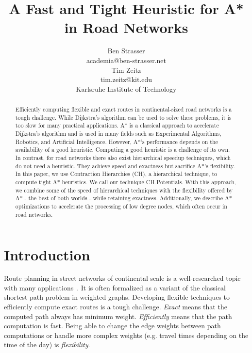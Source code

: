 \documentclass[letterpaper]{article} %
\title{A Fast and Tight Heuristic for A* in Road Networks}
\author{Ben Strasser\\
academia@ben-strasser.net\\
\And
Tim Zeitz\\
tim.zeitz@kit.edu\\
Karlsruhe Institute of Technology
}
\begin{document}
\maketitle


\begin{abstract}
Efficiently computing flexible and exact routes in continental-sized road networks is a tough challenge.
While Dijkstra's algorithm can be used to solve these problems, it is too slow for many practical applications.
A* is a classical approach to accelerate Dijkstra's algorithm and is used in many fields such as Experimental Algorithms, Robotics, and Artificial Intelligence.
However, A*'s performance depends on the availability of a good heuristic.
Computing a good heuristic is a challenge of its own.
In contrast, for road networks there also exist hierarchical speedup techniques, which do not need a heuristic.
They achieve speed and exactness but sacrifice A*'s flexibility.
In this paper, we use Contraction Hierarchies (CH), a hierarchical technique, to compute tight A* heuristics.
We call our technique CH-Potentials.
With this approach, we combine some of the speed of hierarchical techniques with the flexibility offered by A* - the best of both worlds - while retaining exactness.
Additionally, we describe A* optimizations to accelerate the processing of low degree nodes, which often occur in road networks.
\end{abstract}

\section{Introduction}
\label{sec:intro}
Route planning in street networks of continental scale is a well-researched topic with many applications~\cite{bdgmpsww-rptn-16}.
It is often formalized as a variant of the classical shortest path problem in weighted graphs.
Developing flexible techniques to efficiently compute exact routes is a tough challenge.
\emph{Exact} means that the computed path always has minimum weight.
\emph{Efficiently} means that the path computation is fast.
Being able to change the edge weights between path computations or handle more complex weights (e.g. travel times depending on the time of the day) is \emph{flexibility}.
\end{document}
